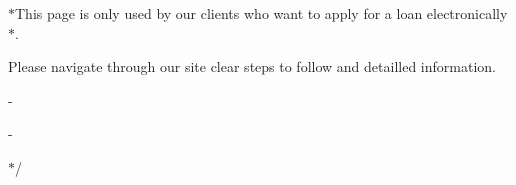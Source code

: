 $\ast$\+This page is only used by our clients who want to apply for a loan electronically $\ast$.
\begin{DoxyItemize}
\item Please navigate through our site clear steps to follow and detailled information.
\item -\/
\item -\/
\end{DoxyItemize}

$\ast$/ 